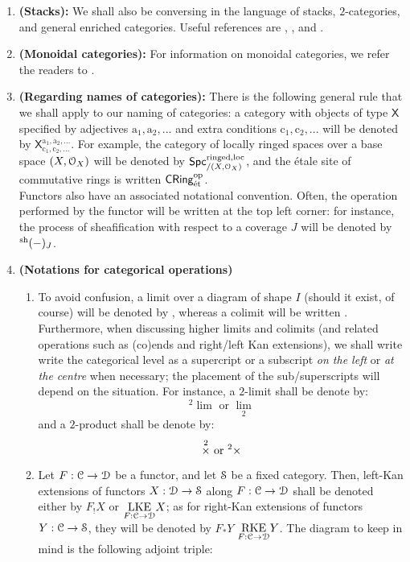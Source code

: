 \begin{enumerate}
\begin{enumerate}
                \item \textbf{(Stacks):} We shall also be conversing in the language of stacks, $2$-categories, and general enriched categories. Useful references are \cite{vistoli_descent}, \cite{leinster_higher_categories}, and \cite{kelly_enriched_categories}.
                \item \textbf{(Monoidal categories):} For information on monoidal categories, we refer the readers to \cite{EGNO}.
                \item \textbf{(Regarding names of categories):} There is the following general rule that we shall apply to our naming of categories: a category with objects of type $\mathsf{X}$ specified by adjectives $\mathrm{a_1, a_2, ...}$ and extra conditions $\mathrm{c_1, c_2, ...}$ will be denoted by $\mathsf{X}^{\mathrm{a_1, a_2, ...}}_{\mathrm{c_1, c_2, ...}}$. For example, the category of locally ringed spaces over a base space $(X, \calO_X)$ will be denoted by $\Spc^{\ringed, \loc}_{/(X, \calO_X)}$, and the \'etale site of commutative rings is written $\Cring^{\op}_{\et}$. 
                \\
                Functors also have an associated notational convention. Often, the operation performed by the functor will be written at the top left corner: for instance, the process of sheafification with respect to a coverage $J$ will be denoted by ${}^{\sh}(-)_J$.
                \item \textbf{(Notations for categorical operations)} 
                    \begin{enumerate}
                        \item To avoid confusion, a limit over a diagram of shape $I$ (should it exist, of course) will be denoted by , whereas a colimit will be written . Furthermore, when discussing higher limits and colimits (and related operations such as (co)ends and right/left Kan extensions), we shall write write the categorical level as a supercript or a subscript \textit{on the left} or \textit{at the centre} when necessary; the placement of the sub/superscripts will depend on the situation. For instance, a $2$-limit shall be denote by:
                            $$\text{${}^2\lim$ or $\underset{2}{\lim}$}$$
                        and a $2$-product shall be denote by:
                            $$\text{$\x^2$ or ${}^2\x$}$$
                        \item Let $F: \C \to \D$ be a functor, and let $\S$ be a fixed  category. Then, left-Kan extensions of functors $X: \D \to \S$ along $F: \C \to \D$ shall be denoted either by $F_! X$ or $\underset{F: \C \to \D}{\LKE} X$; as for right-Kan extensions of functors $Y: \C \to \S$, they will be denoted by $F_* Y$ $\underset{F: \C \to \D}{\RKE} Y$. The diagram to keep in mind is the following adjoint triple:

\end{enumerate}
\end{enumerate}
\end{enumerate}
